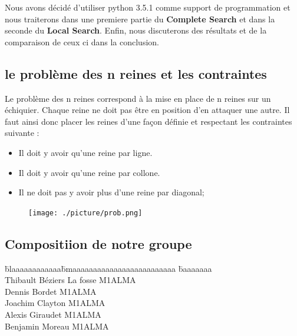 \documentclass{article}
\begin{document}
Nous avons décidé d'utiliser python 3.5.1 comme support de programmation et
nous traiterons dans une premiere partie du \textbf{Complete Search} et dans la seconde du \textbf{Local Search}.
Enfin, nous discuterons des résultats et de la comparaison de ceux ci dans la conclusion.


\vspace{1cm}

\subsection{le problème des n reines et les contraintes}

Le problème des n reines correspond à la mise en place de n reines sur un échiquier. Chaque reine ne doit pas être en position d'en attaquer une autre.
Il faut ainsi donc placer les reines d'une façon définie et respectant les contraintes suivante :

\begin{itemize}
\item Il doit y avoir qu'une reine par ligne.
\item Il doit y avoir qu'une reine par collone.
\item Il ne doit pas y avoir plus d'une reine par diagonal;
\end{itemize}


\begin{figure}[h]
\texttt{[image: ./picture/prob.png]}
\end{figure}


\newpage
\subsection{Compositiion de notre groupe}

\vspace{1cm}

\begin{tabbing}


\=blaaaaaaaaaaaa\=bmaaaaaaaaaaaaaaaaaaaaaaaaa   \=baaaaaaa\kill \\
\>Thibault 	\>Béziers La fosse		\>M1ALMA\\
\>Dennis	\>Bordet			\>M1ALMA\\
\>Joachim	\>Clayton			\>M1ALMA\\
\>Alexis	\>Giraudet			\>M1ALMA\\
\>Benjamin 	\>Moreau			\>M1ALMA\\


\end{tabbing}
\end{document}
